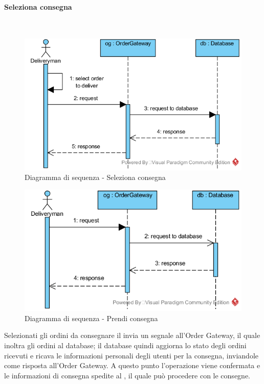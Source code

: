 \begin{samepage}
\paragraph{Seleziona consegna}\mbox{}\\
\end{samepage}
\begin{figure}[H]
	\centering
	\includegraphics[width=15cm]{../../documenti/SpecificaTecnica/diagrammi/sequenza/fattorino_seleziona_consegna.png}
	\caption{Diagramma di sequenza - Seleziona consegna}
\end{figure}
\begin{figure}[H]
	\centering
	\includegraphics[width=15cm]{../../documenti/SpecificaTecnica/diagrammi/sequenza/fattorino_prendi_consegna.png}
	\caption{Diagramma di sequenza - Prendi consegna}
\end{figure}
Selezionati gli ordini da consegnare il \Deliveryman{} invia un segnale all'Order Gateway, il quale inoltra gli ordini al database; il database quindi aggiorna lo stato degli ordini ricevuti e ricava le informazioni personali degli utenti per la consegna, inviandole come risposta all'Order Gateway. A questo punto l'operazione viene confermata e le informazioni di consegna spedite al \Deliveryman{}, il quale può procedere con le consegne.

